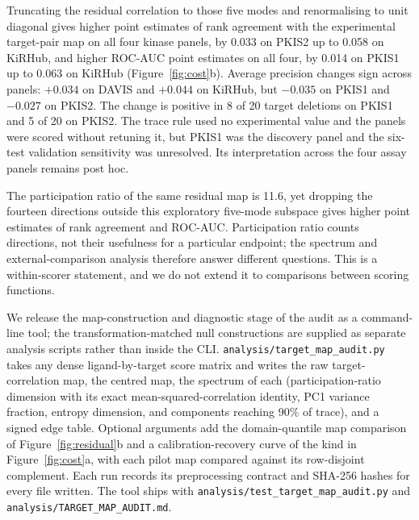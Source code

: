 Truncating the residual correlation to those five modes and renormalising to unit
diagonal gives higher point estimates of rank agreement with the experimental target-pair map
on all four kinase panels, by 0.033 on PKIS2 up to 0.058 on KiRHub, and higher ROC-AUC point
estimates on all four, by 0.014 on PKIS1 up to 0.063 on KiRHub (Figure~\ref{fig:cost}b).
Average precision changes sign across panels: $+0.034$ on DAVIS and $+0.044$ on KiRHub, but
$-0.035$ on PKIS1 and $-0.027$ on PKIS2. The change is positive in 8 of 20 target deletions on
PKIS1 and 5 of 20 on PKIS2. The trace rule used no experimental value and the panels were
scored without retuning it, but PKIS1 was the discovery panel and the six-test validation
sensitivity was unresolved. Its interpretation across the four assay panels remains post hoc.

The participation ratio of the same residual map is 11.6, yet dropping the fourteen directions
outside this exploratory five-mode subspace gives higher point estimates of rank agreement and
ROC-AUC. Participation ratio counts directions, not their usefulness for a particular endpoint;
the spectrum and external-comparison analysis therefore answer different questions.
This is a within-scorer statement, and we do not extend it to comparisons between
scoring functions.

We release the map-construction and diagnostic stage of the audit as a command-line tool;
the transformation-matched null constructions are supplied as separate analysis scripts
rather than inside the CLI. \texttt{analysis/target\_map\_audit.py} takes any dense ligand-by-target score
matrix and writes the raw target-correlation map, the centred map, the spectrum of
each (participation-ratio dimension with its exact mean-squared-correlation
identity, PC1 variance fraction, entropy dimension, and components reaching 90\% of
trace), and a signed edge table. Optional arguments add the domain-quantile map
comparison of Figure~\ref{fig:residual}b and a calibration-recovery curve of the
kind in Figure~\ref{fig:cost}a, with each pilot map compared against its
row-disjoint complement. Each run records its preprocessing contract and SHA-256
hashes for every file written. The tool ships with
\texttt{analysis/test\_target\_map\_audit.py} and
\texttt{analysis/TARGET\_MAP\_AUDIT.md}.
